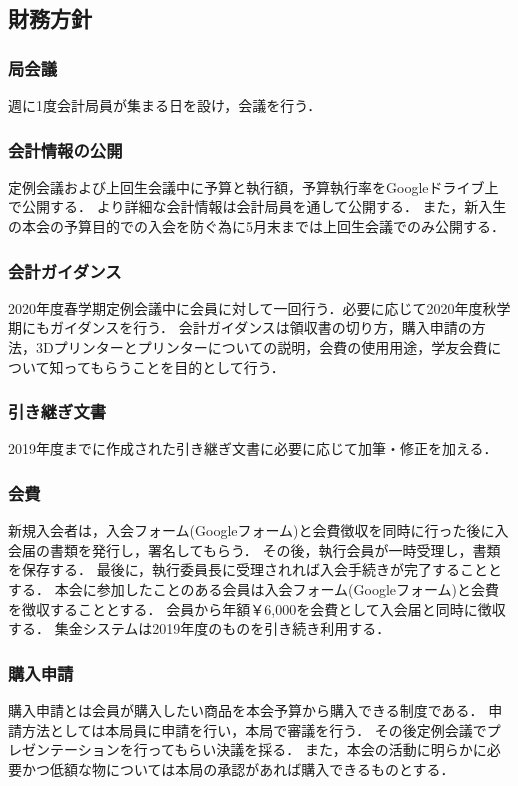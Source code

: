 \subsection*{財務方針}

\subsubsection*{局会議}
週に1度会計局員が集まる日を設け，会議を行う．

\subsubsection*{会計情報の公開}
定例会議および上回生会議中に予算と執行額，予算執行率をGoogleドライブ上で公開する．
より詳細な会計情報は会計局員を通して公開する．
また，新入生の本会の予算目的での入会を防ぐ為に5月末までは上回生会議でのみ公開する．

\subsubsection*{会計ガイダンス}
2020年度春学期定例会議中に会員に対して一回行う．必要に応じて2020年度秋学期にもガイダンスを行う．
会計ガイダンスは領収書の切り方，購入申請の方法，3Dプリンターとプリンターについての説明，会費の使用用途，学友会費について知ってもらうことを目的として行う．

\subsubsection*{引き継ぎ文書}
2019年度までに作成された引き継ぎ文書に必要に応じて加筆・修正を加える．

\subsubsection*{会費}
新規入会者は，入会フォーム(Googleフォーム)と会費徴収を同時に行った後に入会届の書類を発行し，署名してもらう．
その後，執行会員が一時受理し，書類を保存する．
最後に，執行委員長に受理されれば入会手続きが完了することとする．
本会に参加したことのある会員は入会フォーム(Googleフォーム)と会費を徴収することとする．
会員から年額￥6,000を会費として入会届と同時に徴収する．
集金システムは2019年度のものを引き続き利用する．

\subsubsection*{購入申請}
購入申請とは会員が購入したい商品を本会予算から購入できる制度である．
申請方法としては本局員に申請を行い，本局で審議を行う．
その後定例会議でプレゼンテーションを行ってもらい決議を採る．
また，本会の活動に明らかに必要かつ低額な物については本局の承認があれば購入できるものとする．

